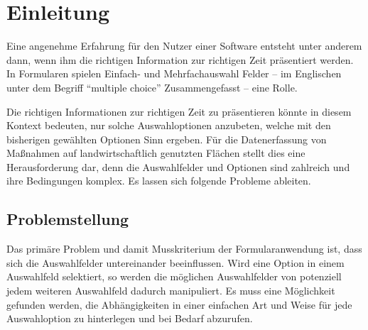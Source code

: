 \chapter{Einleitung}

Eine angenehme Erfahrung für den Nutzer einer Software entsteht unter anderem dann,
wenn ihm die richtigen Information zur richtigen Zeit präsentiert werden.
In Formularen spielen Einfach- und Mehrfachauswahl Felder
-- im Englischen unter dem Begriff \enquote{multiple choice} Zusammengefasst -- eine Rolle.



Die richtigen Informationen zur richtigen Zeit zu präsentieren könnte in diesem Kontext bedeuten,
nur solche Auswahloptionen anzubeten,
welche mit den bisherigen gewählten Optionen Sinn ergeben.
Für die Datenerfassung von Maßnahmen auf landwirtschaftlich genutzten Flächen stellt dies eine Herausforderung dar,
denn die Auswahlfelder und Optionen sind zahlreich und ihre Bedingungen komplex.
Es lassen sich folgende Probleme ableiten. 

\section{Problemstellung}

Das primäre Problem und damit Musskriterium der Formularanwendung ist,
dass sich die Auswahlfelder untereinander beeinflussen.
Wird eine Option in einem Auswahlfeld selektiert,
so werden die möglichen Auswahlfelder von potenziell jedem weiteren Auswahlfeld dadurch manipuliert.
Es muss eine Möglichkeit gefunden werden,
die Abhängigkeiten in einer einfachen Art und Weise für jede Auswahloption zu hinterlegen und bei Bedarf abzurufen.


